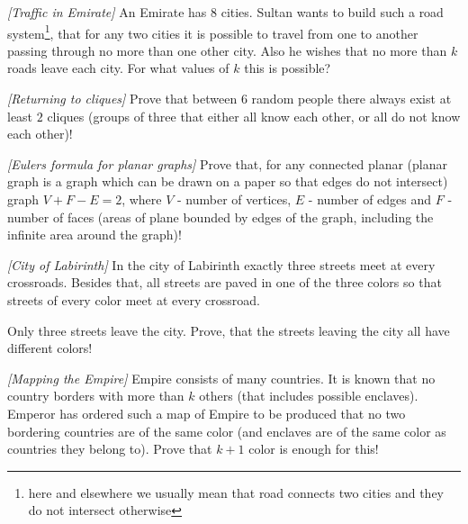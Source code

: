 

%



\noindent 


\begin{problem}
\textit{[Traffic in Emirate]}
An Emirate has 8 cities. Sultan wants to build such a road system\footnote{here and elsewhere we usually mean that road connects two cities and they do not intersect otherwise}, that for any two cities it is possible to travel from one to another passing through no more than one other city. Also he wishes that no more than $k$ roads leave each city. For what values of $k$ this is possible?
\end{problem}
%

\begin{problem}
\textit{[Returning to cliques]}
Prove that between $6$ random people there always exist at least $2$ cliques (groups of three that either all know each other, or all do not know each other)!
\end{problem}
%

\begin{problem}
\textit{[Eulers formula for planar graphs]}
Prove that, for any connected planar (planar graph is a graph which can be drawn on a paper so that edges do not intersect) graph $V+F-E=2$, where $V$ - number of vertices, $E$ - number of edges and $F$ - number of faces (areas of plane bounded by edges of the graph, including the infinite area around the graph)!
\end{problem}





\begin{problem}
\textit{[City of Labirinth]}
In the city of Labirinth exactly three streets meet at every crossroads. Besides that, all streets are paved in one of the three colors so that streets of every color meet at every crossroad.
 
Only three streets leave the city. Prove, that the streets leaving the city all have different colors! 
\end{problem}
%

\begin{problem}
\textit{[Mapping the Empire]}
Empire consists of many countries. It is known that no country borders with more than $k$ others (that includes possible enclaves). Emperor has ordered such a map of Empire to be produced that no two bordering countries are of the same color (and enclaves are of the same color as countries they belong to). Prove that $k+1$ color is enough for this!
\end{problem}
%

